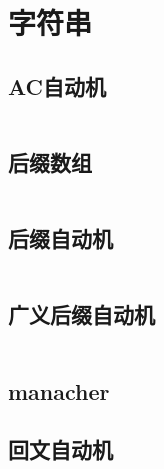 \chapter{字符串}
\section{AC自动机}
\inputminted{cpp}{\source/string/Aho-Corasick-automaton.cpp}
\section{后缀数组}
\inputminted{cpp}{\source/string/suffix-array.cpp}
\section{后缀自动机}
\inputminted{cpp}{\source/string/suffix-automaton.cpp}
\section{广义后缀自动机}
\inputminted{cpp}{\source/string/ex-suffix-automaton.cpp}
\section{manacher}
\section{回文自动机}
\inputminted{cpp}{\source/string/palindromic-tree.cpp}

